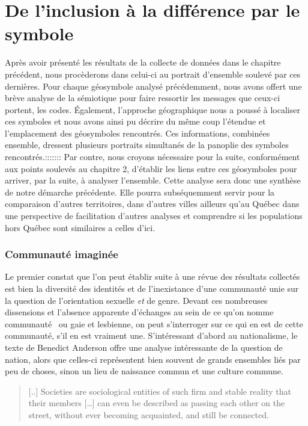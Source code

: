 
\chapter{De l'inclusion à la différence par le symbole}
\label{cha:de_l_inclusion_la_diff_rence_par_le_symbole}

Après avoir présenté les résultats de la collecte de données dans le chapitre précédent, nous procèderons dans celui-ci au portrait d'ensemble soulevé par ces dernières.
Pour chaque géosymbole analysé précédemment, nous avons offert une brève analyse de la sémiotique pour faire ressortir les messages que ceux-ci portent, les codes.
Également, l'approche géographique nous a poussé à localiser ces symboles et nous avons ainsi pu décrire du même coup l'étendue et l'emplacement des géosymboles rencontrés.
Ces informations, combinées ensemble, dressent plusieurs portraits simultanés de la panoplie des symboles rencontrés.:::::::
Par contre, nous croyons nécessaire pour la suite, conformément aux points soulevés au chapitre 2, d'établir les liens entre ces géosymboles pour arriver, par la suite, à analyser l'ensemble.
Cette analyse sera donc une synthèse de notre démarche précédente.
Elle pourra subséquemment servir pour la comparaison d'autres territoires, dans d'autres villes ailleurs qu'au Québec dans une perspective de facilitation d'autres analyses et comprendre si les populations \lgbt{} hors Québec sont similaires a celles d'ici.


\subsection{Communauté imaginée}
\label{sub:communaut_imagin_e}
Le premier constat que l'on peut établir suite à une révue des résultats collectés est bien la diversité des identités \lgbt{} et de l'inexistance d'une communauté unie sur la question de l'orientation sexuelle \emph{et} de genre.
Devant ces nombreuses dissensions et l'absence apparente d'échanges au sein de ce qu'on nomme communauté~\lgbt{} ou gaie et lesbienne, on peut s'interroger sur ce qui en est de cette communauté, s'il en est vraiment une.
S'intéressant d'abord au nationalisme, le texte de Benedict Anderson offre une analyse intéressante de la question de nation, alors que celles-ci représentent bien souvent de grands ensembles liés par peu de choses, sinon un lieu de naissance commun et une culture commune.
\begin{quote}	
[..] Societies are sociological entities of such firm and stable reality that their members […] can even be described as passing each other on the street, without ever becoming acquainted, and still be connected.~\citep[25]{Anderson1983}
\end{quote}

